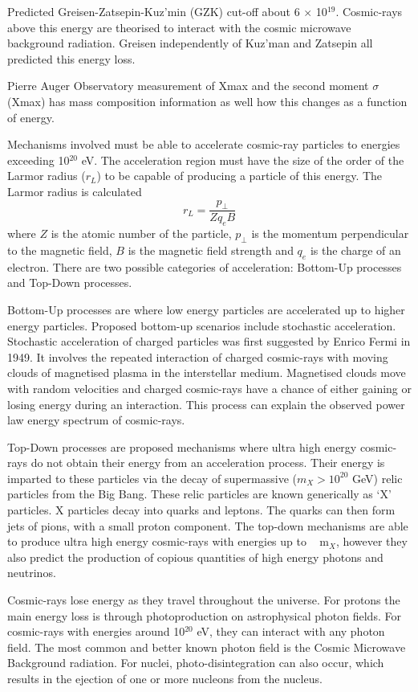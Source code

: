 Predicted Greisen-Zatsepin-Kuz’min (GZK) cut-off about 6 $\times$ 10$^{19}$. Cosmic-rays above this energy are theorised to interact with the cosmic microwave background radiation. Greisen independently of Kuz'man and Zatsepin all predicted this energy loss.

Pierre Auger Observatory measurement of Xmax and the second moment $\sigma$(Xmax) has mass composition information as well how this changes as a function of energy.

Mechanisms involved must be able to accelerate cosmic-ray particles to energies exceeding 10$^{20}$ eV. The acceleration region must have the size of the order of the Larmor radius ($r_L$) to be capable of producing a particle of this energy. The Larmor radius is calculated
\begin{equation}
r_L = \frac{p_{\perp}}{Z q_e B}
\end{equation} 
where $Z$ is the atomic number of the particle, $p_{\perp}$ is the momentum perpendicular to the magnetic field, $B$ is the magnetic field strength and $q_e$ is the charge of an electron. There are two possible categories of acceleration: Bottom-Up processes and Top-Down processes.

Bottom-Up processes are where low energy particles are accelerated up to higher energy particles. Proposed bottom-up scenarios include stochastic acceleration. Stochastic acceleration of charged particles was first suggested by Enrico Fermi in 1949. It involves the repeated interaction of charged cosmic-rays with moving clouds of magnetised plasma in the interstellar medium. Magnetised clouds move with random velocities and charged cosmic-rays have a chance of either gaining or losing energy during an interaction. This process can explain the observed power law energy spectrum of cosmic-rays.

Top-Down processes are proposed mechanisms where ultra  high energy cosmic-rays do not obtain their energy from an acceleration process. Their energy is imparted to these particles via the decay of supermassive ($m_X > 10^{20}$ GeV) relic particles from the Big Bang. These relic particles are known generically as `X' particles. X particles decay into quarks and leptons. The quarks can then form jets of pions, with a small proton component. The top-down mechanisms are able to produce ultra high energy cosmic-rays with energies up to ~ m$_X$, however they also predict the production of copious quantities of high energy photons and neutrinos.

Cosmic-rays lose energy as they travel throughout the universe. For protons the main energy loss is through photoproduction on astrophysical photon fields. For cosmic-rays with energies around 10$^{20}$ eV, they can interact with any photon field. The most common and better known photon field is the Cosmic Microwave Background radiation. For nuclei, photo-disintegration can also occur, which results in the ejection of one or more nucleons from the nucleus.

